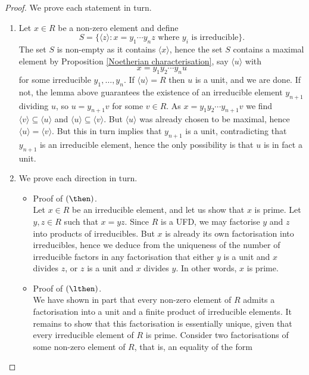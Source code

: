 \documentclass[12pt, a4paper]{article}
\begin{document}
\begin{proof}
    We prove each statement in turn.
    \begin{enumerate}
        \item Let \(x \in R\) be a non-zero element and define 
        \[S = \{\langle z\rangle :x=y_1\cdots y_n z \text{ where } y_i \text{ is irreducible}\}.\]The set \( S \) is non-empty as it contains \( \langle x \rangle \), hence the set \( S \) contains a maximal element by Proposition \ref{Noetherian characterisation}, say \( \langle u \rangle \) with
        \[ x = y_1y_2 \cdots y_nu \]
        for some irreducible \( y_1, \ldots, y_n \). If \( \langle u \rangle = R \) then \( u \) is a unit, and we are done. If not, the lemma above guarantees the existence of an irreducible element \( y_{n+1} \) dividing \( u \), so \( u = y_{n+1}v \) for some \( v \in R \). As \( x = y_1y_2 \cdots y_{n+1}v \) we find \( \langle v \rangle \subseteq \langle u \rangle \) and \( \langle u \rangle \subseteq \langle v \rangle \). But \( \langle u \rangle \) was already chosen to be maximal, hence \( \langle u \rangle = \langle v \rangle \). But this in turn implies that \( y_{n+1} \) is a unit, contradicting that \( y_{n+1} \) is an irreducible element, hence the only possibility is that \( u \) is in fact a unit.
        \item We prove each direction in turn.
        \begin{itemize}
            \item Proof of \((\then)\). \\
            Let \( x \in R \) be an irreducible element, and let us show that \( x \) is prime. Let \( y, z \in R \) such that \( x = yz \). Since \( R \) is a UFD, we may factorise \( y \) and \( z \) into products of irreducibles. But \( x \) is already its own factorisation into irreducibles, hence we deduce from the uniqueness of the number of irreducible factors in any factorisation that either \( y \) is a unit and \( x \) divides \( z \), or \( z \) is a unit and \( x \) divides \( y \). In other words, \( x \) is prime.
            \item Proof of \((\lthen)\). \\
            We have shown in part that every non-zero element of \( R \) admits a factorisation into a unit and a finite product of irreducible elements. It remains to show that this factorisation is essentially unique, given that every irreducible element of \( R \) is prime. Consider two factorisations of some non-zero element of \( R \), that is, an equality of the form


\end{itemize}
\end{enumerate}
\end{proof}
\end{document}
